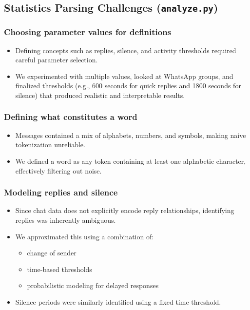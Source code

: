 \documentclass[11pt,a4paper]{article}
\begin{document}
\subsection{Statistics Parsing Challenges (\texttt{analyze.py})}

\subsubsection{Choosing parameter values for definitions}
\begin{itemize}
\item Defining concepts such as replies, silence, and activity thresholds required careful parameter selection.
\item We experimented with multiple values, looked at WhatsApp groups, and finalized thresholds (e.g., 600 seconds for quick replies and 1800 seconds for silence) that produced realistic and interpretable results.
\end{itemize}

\subsubsection{Defining what constitutes a word}
\begin{itemize}
\item Messages contained a mix of alphabets, numbers, and symbols, making naive tokenization unreliable.
\item We defined a word as any token containing at least one alphabetic character, effectively filtering out noise.
\end{itemize}

\subsubsection{Modeling replies and silence}
\begin{itemize}
\item Since chat data does not explicitly encode reply relationships, identifying replies was inherently ambiguous.
\item We approximated this using a combination of:
\begin{itemize}
    \item change of sender
    \item time-based thresholds
    \item probabilistic modeling for delayed responses
\end{itemize}
\item Silence periods were similarly identified using a fixed time threshold.
\end{itemize}
\end{document}
